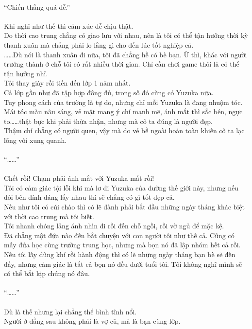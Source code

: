 \documentclass[12pt,a4paper, twosides]{book}
\begin{document}
\\
“Chiến thắng quá dễ.”\\
\\
Khi nghĩ như thế thì cảm xúc dễ chịu thật.\\
Do thời cao trung chẳng có giao lưu với nhau, nên là tôi có thể tận hưởng thời kỳ thanh xuân mà chẳng phải lo lắng gì cho đến lúc tốt nghiệp cả.\\
……Dù nói là thanh xuân đi nữa, tôi đã chẳng hề có bè bạn. Ừ thì, khác với người trưởng thành ở chỗ tôi có rất nhiều thời gian. Chỉ cần chơi game thôi là có thể tận hưởng nhỉ.\\
Tôi thay giày rồi tiến đến lớp 1 năm nhất.\\
Cả lớp gần như đã tập hợp đông đủ, trong số đó cũng có Yuzuka nữa.\\
Tuy phong cách của trường là tự do, nhưng chỉ mỗi Yuzuka là đang nhuộm tóc. Mái tóc màu nâu sáng, vẻ mặt mang ý chí mạnh mẽ, ánh mắt thì sắc bén, ngực to……thật bực khi phải thừa nhận, nhưng mà cô ta đúng là người đẹp.\\
Thậm chí chẳng có người quen, vậy mà do vẻ bề ngoài hoàn toàn khiến cô ta lạc lõng với xung quanh.\\
\\
“……”\\
\\
Chết rồi! Chạm phải ánh mắt với Yuzuka mất rồi!\\
Tôi có cảm giác tội lỗi khi mà lơ đi Yuzuka của đường thế giới này, nhưng nếu đôi bên dính dáng lấy nhau thì sẽ chẳng có gì tốt đẹp cả.\\
Nếu như tôi có cúi chào thì có lẽ đành phải bắt đầu những ngày tháng khác biệt với thời cao trung mà tôi biết.\\
Tôi nhanh chóng lảng ánh nhìn đi rồi đến chỗ ngồi, rồi vờ ngủ để mặc kệ.\\
Đã chẳng một đứa nào đến bắt chuyện với con người tôi như thế cả. Cũng có mấy đứa học cùng trường trung học, nhưng mà bọn nó đã lập nhóm hết cả rồi.\\
Nếu tôi lấy dũng khí rồi hành động thì có lẽ những ngày tháng bạn bè sẽ đến đấy, nhưng cảm giác là tất cả bọn nó đều dưới tuổi tôi. Tôi không nghĩ mình sẽ có thể bắt kịp chúng nó đâu.\\
\\
“……”\\
\\
Dù là thế nhưng lại chẳng thể bình tĩnh nổi.\\
Người ở đằng sau không phải là vợ cũ, mà là bạn cùng lớp.\\
\end{document}
